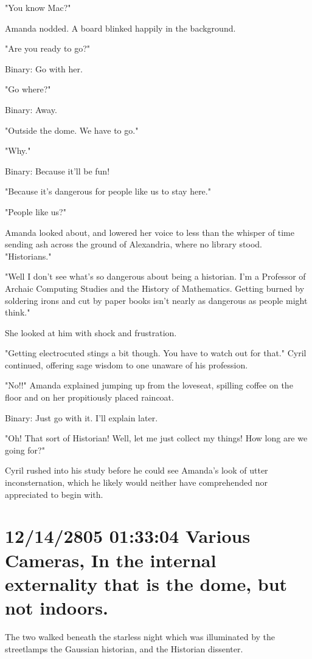 \documentclass[12pt]{book}
\begin{document}
"You know Mac?"

Amanda nodded. A board blinked happily in the background.

"Are you ready to go?"

Binary: Go with her.

"Go where?"

Binary: Away.

"Outside the dome. We have to go."

"Why."

Binary: Because it'll be fun!

"Because it's dangerous for people like us to stay here."

"People like us?"

Amanda looked about, and lowered her voice to less than the whisper of time sending ash across the ground of Alexandria, where no library stood. "Historians."

"Well I don't see what's so dangerous about being a historian. I'm a Professor of Archaic Computing Studies and the History of Mathematics. Getting burned by soldering irons and cut by paper books isn't nearly as dangerous as people might think."

She looked at him with shock and frustration.

"Getting electrocuted stings a bit though. You have to watch out for that." Cyril continued, offering sage wisdom to one unaware of his profession.

"No!!" Amanda explained jumping up from the loveseat, spilling coffee on the floor and on her propitiously placed raincoat.

Binary: Just go with it. I'll explain later.

"Oh! That sort of Historian! Well, let me just collect my things! How long are we going for?"

Cyril rushed into his study before he could see Amanda's look of utter inconsternation, which he likely would neither have comprehended nor appreciated to begin with.

\section*{12/14/2805 01:33:04 Various Cameras, In the internal externality that is the dome, but not indoors.}
\label{sec:orgc3e8c8c}

The two walked beneath the starless night which was illuminated by the streetlamps the Gaussian historian, and the Historian dissenter.
\end{document}
